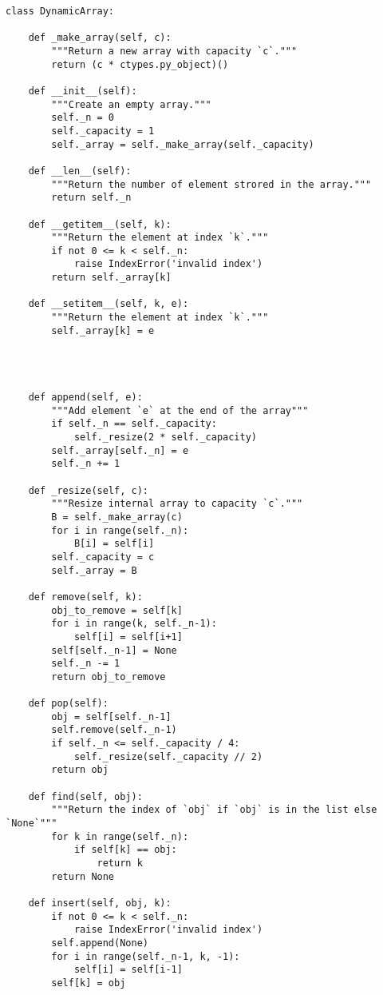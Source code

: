 \documentclass[10pt]{article}
\begin{document}
\begin{verbatim}
class DynamicArray:

    def _make_array(self, c):
        """Return a new array with capacity `c`."""
        return (c * ctypes.py_object)()

    def __init__(self):
        """Create an empty array."""
        self._n = 0                                    
        self._capacity = 1
        self._array = self._make_array(self._capacity) 
    
    def __len__(self):
        """Return the number of element strored in the array."""
        return self._n

    def __getitem__(self, k):
        """Return the element at index `k`."""
        if not 0 <= k < self._n:
            raise IndexError('invalid index')
        return self._array[k]
	
	def __setitem__(self, k, e):
	    """Return the element at index `k`."""
	    self._array[k] = e
	    
	    
	    
	        
    def append(self, e):
        """Add element `e` at the end of the array"""
        if self._n == self._capacity:
            self._resize(2 * self._capacity)
        self._array[self._n] = e
        self._n += 1

    def _resize(self, c):
        """Resize internal array to capacity `c`."""
        B = self._make_array(c)
        for i in range(self._n):
            B[i] = self[i]
        self._capacity = c
        self._array = B
    
    def remove(self, k):
        obj_to_remove = self[k]
        for i in range(k, self._n-1):
            self[i] = self[i+1] 
        self[self._n-1] = None
        self._n -= 1
        return obj_to_remove
    
    def pop(self):
        obj = self[self._n-1]
        self.remove(self._n-1)
        if self._n <= self._capacity / 4:
            self._resize(self._capacity // 2)
        return obj 
        
    def find(self, obj):
        """Return the index of `obj` if `obj` is in the list else `None`"""
        for k in range(self._n):
            if self[k] == obj:
                return k
        return None
        
    def insert(self, obj, k): 
        if not 0 <= k < self._n:
            raise IndexError('invalid index')
        self.append(None)
        for i in range(self._n-1, k, -1):
            self[i] = self[i-1]
        self[k] = obj
\end{verbatim}
\end{document}
